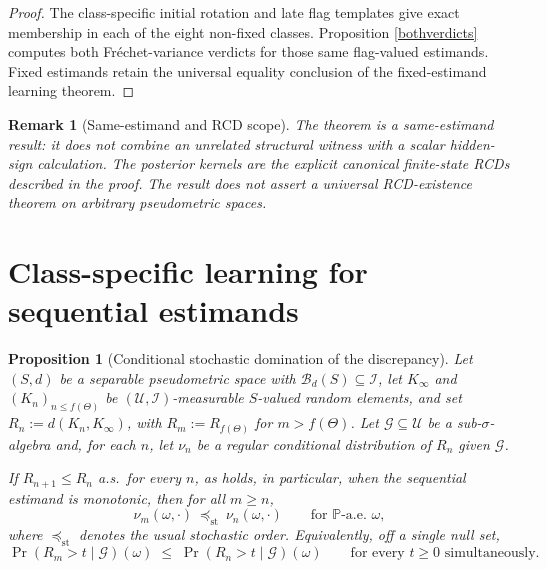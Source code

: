 \documentclass{article}
\newcommand{\G}{\mathcal{G}}
\newcommand{\I}{\mathcal{I}}
\newcommand{\U}{\mathcal{U}}
\newcommand{\1}{\mathbbm{1}}
\newtheorem{prop}{Proposition}
\newtheorem{remark}{Remark}
\begin{document}
\begin{proof}
The class-specific initial rotation and late flag templates give exact membership in each of the
eight non-fixed classes.  Proposition \ref{bothverdicts} computes both Fr\'echet-variance verdicts
for those same flag-valued estimands.  Fixed estimands retain the universal equality conclusion of
the fixed-estimand learning theorem.
\end{proof}

\begin{remark}[Same-estimand and RCD scope]
The theorem is a same-estimand result: it does not combine an unrelated structural witness with a
scalar hidden-sign calculation.  The posterior kernels are the explicit canonical finite-state
RCDs described in the proof.  The result does not assert a universal RCD-existence theorem on
arbitrary pseudometric spaces.
\end{remark}


\section{Class-specific learning for sequential estimands}

\begin{prop}[Conditional stochastic domination of the discrepancy]
\label{tailorder}
Let $(S,d)$ be a separable pseudometric space with $\mathcal{B}_d(S)\subseteq\I$, let $K_\infty$ and
$(K_n)_{n\le f(\Theta)}$ be $(\U,\I)$-measurable $S$-valued random elements, and set
$R_n:=d(K_n,K_\infty)$, with $R_m:=R_{f(\Theta)}$ for $m>f(\Theta)$. Let $\G\subseteq\U$ be a
sub-$\sigma$-algebra and, for each $n$, let $\nu_n$ be a regular conditional distribution of $R_n$
given $\G$.

If $R_{n+1}\leq R_n$ a.s.\ for every $n$, as holds, in particular,
when the sequential estimand is monotonic, then for all $m\geq n$,
\[
\nu_m(\omega,\cdot)\ \preceq_{\mathrm{st}}\ \nu_n(\omega,\cdot)\qquad\text{for }\mathbb{P}\text{-a.e. }\omega,
\]
where $\preceq_{\mathrm{st}}$ denotes the usual stochastic order. Equivalently, off a single null set,
\[
\Pr(R_m>t\mid\G)(\omega)\;\le\;\Pr(R_n>t\mid\G)(\omega)\qquad\text{for every }t\ge0
\text{ simultaneously.}
\]
\end{prop}
\end{document}
